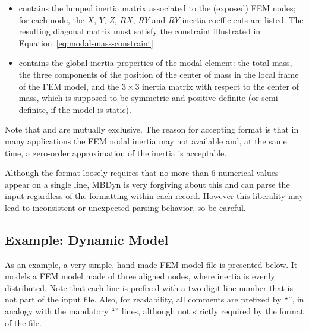 \begin{itemize}
\item {} contains the lumped inertia matrix
associated to the  (exposed) FEM nodes;
for each node, the $X$, $Y$, $Z$, $RX$, $RY$ and $RY$ inertia
coefficients are listed.
The resulting diagonal matrix must satisfy the constraint
illustrated in Equation~\ref{eq:modal-mass-constraint}.

\item {} contains the global inertia properties
of the modal element: the total mass, the three components 
of the position of the center of mass in the local frame
of the FEM model, and the $3\times{3}$ inertia matrix
with respect to the center of mass, which is supposed
to be symmetric and positive definite (or semi-definite,
if the model is static).
\end{itemize}

Note that  and  are mutually
exclusive.
The reason for accepting  format is that 
in many applications the FEM nodal inertia may not available and,
at the same time, a zero-order approximation of the inertia 
is acceptable.

Although the format loosely requires that no more than 6 numerical values 
appear on a single line, MBDyn is very forgiving about this and can parse
the input regardless of the formatting within each record.
However this liberality may lead to inconsistent or unexpected parsing
behavior, so be careful.



\subsection{Example: Dynamic Model}
\label{sec:APP:EL:STRUCT:JOINT:MODAL:DYNAMIC-MODEL}
As an example, a very simple, hand-made FEM model file is presented below.
It models a FEM model made of three aligned nodes, where inertia 
is evenly distributed.
Note that each line is prefixed with a two-digit line number 
that is not part of the input file.
Also, for readability, all comments are prefixed by ``\kw{**}'', in analogy
with the mandatory ``'' lines, although not strictly
required by the format of the file.


